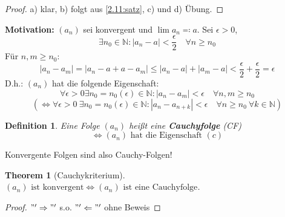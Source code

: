 \documentclass[14pt,titlepage,ngerman,a4paper,headsepline,DIV15,halfparskip*]{scrartcl}
\newcommand{\N}{\mathbb{N}}
\theoremstyle{named}
\newtheorem{namedtheorem}{Theorem} \counterwithin{namedtheorem}{section}
\theoremstyle{dotless}
\newtheorem*{definition}{Definition}
\begin{document}
\begin{proof}
	a) klar, b) folgt aus \ref{2.11:satz}, c) und d) Übung.
\end{proof}


\textbf{Motivation:} $(a_{n})$ sei konvergent und $\lim a_{n} \eqqcolon a$. Sei $\epsilon > 0$,
	$$ \exists n_{0} \in \N: |a_{n} - a| < \frac{\epsilon}{2} \quad \forall n \geq n_{0} $$
Für $n, m \geq n_{0}$:
	$$ |a_{n} - a_{m}| = |a_{n} - a + a - a_{m} | \leq |a_{n} - a| + |a_{m} - a| < \frac{\epsilon}{2} + \frac{\epsilon}{2} = \epsilon $$
D.h.: $(a_{n})$ hat die folgende Eigenschaft:
	\[ \forall \epsilon > 0 \exists n_{0} = n_{0}(\epsilon) \in \N: |a_{n} - a_{m}| < \epsilon \quad \forall n,m \geq n_{0} \tag*{(c)} \]
$$ (\iff \forall \epsilon > 0 ~\exists n_{0} = n_{0}(\epsilon) \in \N: |a_{n} - a_{n+k}| < \epsilon \quad \forall n \geq n_{0} ~\forall k \in \N) $$

\begin{definition} 
	Eine Folge $(a_{n})$ hei{\ss}t eine \textbf{Cauchyfolge} (CF)
	$$ \iff (a_{n}) \text{ hat die Eigenschaft } (c) $$	
\end{definition}


Konvergente Folgen sind also Cauchy-Folgen!

\begin{namedtheorem}[Cauchykriterium] $(a_{n}) \text{ ist konvergent} \iff (a_{n}) \text{ ist eine Cauchyfolge}$. \label{2.15:prop} 
\end{namedtheorem}

\begin{proof}
	$"'\Rightarrow"'$ s.o. $"'\Leftarrow"'$ ohne Beweis
\end{proof}
\end{document}
